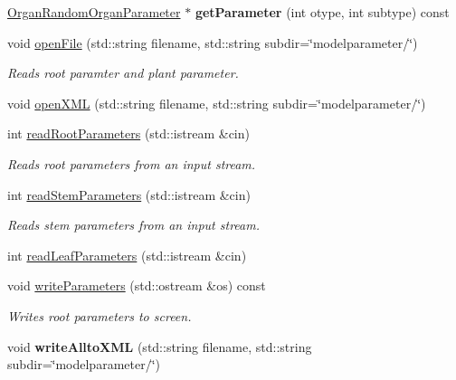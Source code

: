 \begin{DoxyCompactItemize}
\hyperlink{classCPlantBox_1_1OrganRandomOrganParameter}{Organ\+Random\+Organ\+Parameter} $\ast$ {\bfseries get\+Parameter} (int otype, int subtype) const
\item 
\mbox{\label{classCPlantBox_1_1Plant_aec57aca351ffec71e69104c4697d5ad6}} 
void \hyperlink{classCPlantBox_1_1Plant_aec57aca351ffec71e69104c4697d5ad6}{open\+File} (std\+::string filename, std\+::string subdir=\char`\"{}modelparameter/\char`\"{})
\begin{DoxyCompactList}\small\item\em Reads root paramter and plant parameter. \end{DoxyCompactList}\item 
void \hyperlink{classCPlantBox_1_1Plant_a35816a01023b902882e7ddae14b3edd8}{open\+X\+ML} (std\+::string filename, std\+::string subdir=\char`\"{}modelparameter/\char`\"{})
\item 
int \hyperlink{classCPlantBox_1_1Plant_a41f9274cd87aef972373c96be1c92ad3}{read\+Root\+Parameters} (std\+::istream \&cin)
\begin{DoxyCompactList}\small\item\em Reads root parameters from an input stream. \end{DoxyCompactList}\item 
int \hyperlink{classCPlantBox_1_1Plant_ae592bd7cf3a9ef7c5140bc14b40b96a9}{read\+Stem\+Parameters} (std\+::istream \&cin)
\begin{DoxyCompactList}\small\item\em Reads stem parameters from an input stream. \end{DoxyCompactList}\item 
int \hyperlink{classCPlantBox_1_1Plant_a013fc03e731d77cce6b4e96bd31a428d}{read\+Leaf\+Parameters} (std\+::istream \&cin)
\item 
void \hyperlink{classCPlantBox_1_1Plant_a7459ed6869064fd4be5a519ebb46cf90}{write\+Parameters} (std\+::ostream \&os) const
\begin{DoxyCompactList}\small\item\em Writes root parameters to screen. \end{DoxyCompactList}\item 
\mbox{\label{classCPlantBox_1_1Plant_a44b8314bd5a80b25c93c073e8344070b}} 
void {\bfseries write\+Allto\+X\+ML} (std\+::string filename, std\+::string subdir=\char`\"{}modelparameter/\char`\"{})
\item 

\end{DoxyCompactItemize}

